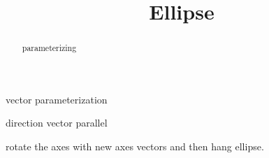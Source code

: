 \documentclass{ximera}
\title{Ellipse}
\begin{document}
\begin{abstract}
parameterizing
\end{abstract}
\maketitle



vector parameterization


direction vector parallel



rotate the axes with new axes vectors and then hang ellipse.
\end{document}
